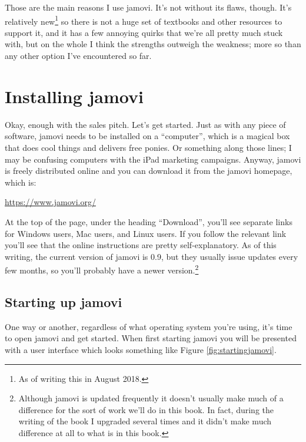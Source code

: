 \documentclass[
]{book}
\begin{document}
Those are the main reasons I use jamovi. It's not without its flaws, though. It's relatively new\footnote{As of writing this in August 2018.} so there is not a huge set of textbooks and other resources to support it, and it has a few annoying quirks that we're all pretty much stuck with, but on the whole I think the strengths outweigh the weakness; more so than any other option I've encountered so far.

\hypertarget{gettingjamovi}{%
\section{Installing jamovi}\label{gettingjamovi}}

Okay, enough with the sales pitch. Let's get started. Just as with any piece of software, jamovi needs to be installed on a ``computer'', which is a magical box that does cool things and delivers free ponies. Or something along those lines; I may be confusing computers with the iPad marketing campaigns. Anyway, jamovi is freely distributed online and you can download it from the jamovi homepage, which is:

\url{https://www.jamovi.org/}

At the top of the page, under the heading ``Download'', you'll see separate links for Windows users, Mac users, and Linux users. If you follow the relevant link you'll see that the online instructions are pretty self-explanatory. As of this writing, the current version of jamovi is 0.9, but they usually issue updates every few months, so you'll probably have a newer version.\footnote{Although jamovi is updated frequently it doesn't usually make much of a difference for the sort of work we'll do in this book. In fact, during the writing of the book I upgraded several times and it didn't make much difference at all to what is in this book.}

\hypertarget{starting-up-jamovi}{%
\subsection{Starting up jamovi}\label{starting-up-jamovi}}

One way or another, regardless of what operating system you're using, it's time to open
jamovi and get started. When first starting jamovi you will be presented with a user interface
which looks something like Figure \ref{fig:startingjamovi}.
\end{document}
